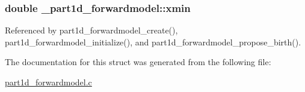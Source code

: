 \subsubsection[{\texorpdfstring{xmin}{xmin}}]{\setlength{\rightskip}{0pt plus 5cm}double \+\_\+part1d\+\_\+forwardmodel\+::xmin}\hypertarget{struct__part1d__forwardmodel_afc68234aafe3f452ba66be391841a467}{}\label{struct__part1d__forwardmodel_afc68234aafe3f452ba66be391841a467}


Referenced by part1d\+\_\+forwardmodel\+\_\+create(), part1d\+\_\+forwardmodel\+\_\+initialize(), and part1d\+\_\+forwardmodel\+\_\+propose\+\_\+birth().



The documentation for this struct was generated from the following file\+:\begin{DoxyCompactItemize}
\item 
\hyperlink{part1d__forwardmodel_8c}{part1d\+\_\+forwardmodel.\+c}\end{DoxyCompactItemize}
